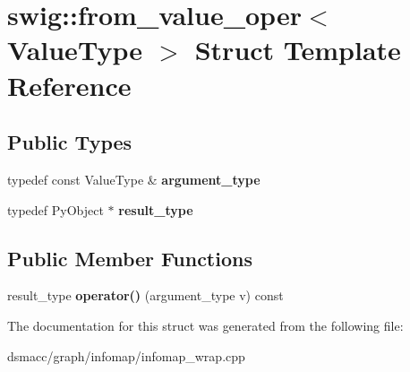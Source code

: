 \hypertarget{structswig_1_1from__value__oper}{}\section{swig\+:\+:from\+\_\+value\+\_\+oper$<$ Value\+Type $>$ Struct Template Reference}
\label{structswig_1_1from__value__oper}
\subsection*{Public Types}
\begin{DoxyCompactItemize}
\item 
\mbox{\label{structswig_1_1from__value__oper_a0795f6ec6d52f5782097a674c6d24d18}} 
typedef const Value\+Type \& {\bfseries argument\+\_\+type}
\item 
\mbox{\label{structswig_1_1from__value__oper_a2599f8d784c6f2cdbe22b72611c367a9}} 
typedef Py\+Object $\ast$ {\bfseries result\+\_\+type}
\end{DoxyCompactItemize}
\subsection*{Public Member Functions}
\begin{DoxyCompactItemize}
\item 
\mbox{\label{structswig_1_1from__value__oper_af3d36ed05b22038b478ec15b3d539a40}} 
result\+\_\+type {\bfseries operator()} (argument\+\_\+type v) const
\end{DoxyCompactItemize}


The documentation for this struct was generated from the following file\+:\begin{DoxyCompactItemize}
\item 
dsmacc/graph/infomap/infomap\+\_\+wrap.\+cpp\end{DoxyCompactItemize}
